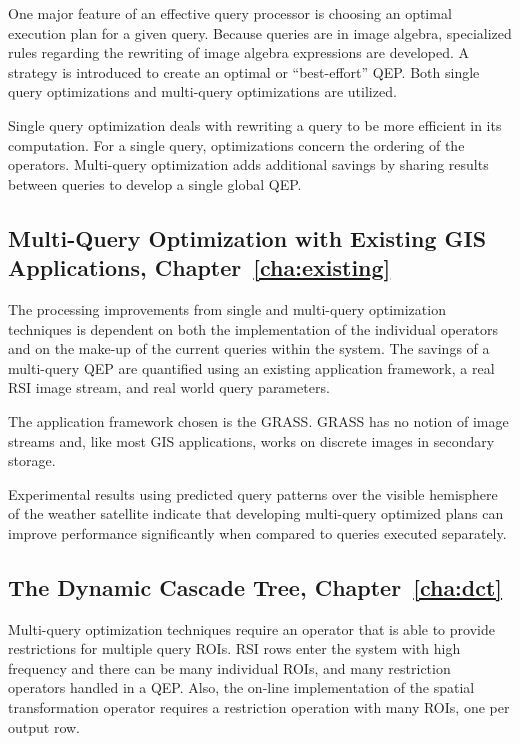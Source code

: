 \documentclass{ucdthesis}       %
\begin{document}
One major feature of an effective query processor is choosing an
optimal execution plan for a given query.  Because queries are in
image algebra, specialized rules regarding the rewriting of image
algebra expressions are developed.  A strategy is introduced to create
an optimal or ``best-effort'' \ac{QEP}.  Both single query optimizations
and multi-query optimizations are utilized.

Single query optimization deals with rewriting a query to be more
efficient in its computation.  For a single query, optimizations
concern the ordering of the operators.  Multi-query optimization adds
additional savings by sharing results between queries to develop
a single global \ac{QEP}.

\subsection*{Multi-Query Optimization with Existing GIS
  Applications, Chapter~\ref{cha:existing}}

The processing improvements from single and multi-query optimization
techniques is dependent on both the implementation of the individual
operators and on the make-up of the current queries within the system.
The savings of a multi-query \ac{QEP} are quantified using an existing
application framework, a real \ac{RSI} image stream, and real world
query parameters.

The application framework chosen is the \acf{GRASS}.  \ac{GRASS} has
no notion of image streams and, like most \ac{GIS} applications, works
on discrete images in secondary storage.

Experimental results using predicted query patterns over the visible
hemisphere of the weather satellite indicate that developing
multi-query optimized plans can improve performance significantly when
compared to queries executed separately.


\subsection*{The Dynamic Cascade Tree, Chapter~\ref{cha:dct}}

Multi-query optimization techniques require an operator that is able
to provide restrictions for multiple query \acp{ROI}.  \ac{RSI} rows
enter the system with high frequency and there can be many individual
\acp{ROI}, and many restriction operators handled in a \ac{QEP}.
Also, the on-line implementation of the spatial transformation
operator requires a restriction operation with many \acp{ROI}, one per
output row.
\end{document}
